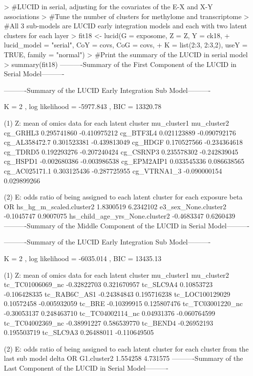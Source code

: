 \begin{example}
> #LUCID in serial, adjusting for the covariates of the E-X and X-Y associations
> #Tune the number of clusters for methylome and transcriptome
> #All 3 sub-models are LUCID early integration models and each with two latent clusters for each layer
> fit18 <- lucid(G = exposome, Z = Z, Y = ck18, 
+                lucid_model = "serial", CoY = covs, CoG = covs, 
+                K = list(2:3, 2:3,2), useY = TRUE, family = "normal")
> #Print the summary of the LUCID in serial model
> summary(fit18)
----------Summary of the First Component of the LUCID in Serial Model---------- 
 
----------Summary of the LUCID Early Integration Sub Model---------- 
 
K =  2 , log likelihood = -5977.843 , BIC =  13320.78 
 
(1) Z: mean of omics data for each latent cluster 
               mu_cluster1  mu_cluster2
cg_GRHL3       0.295741860 -0.410975212
cg_BTF3L4      0.021123889 -0.090792176
cg_AL358472.7  0.301523381 -0.439813049
cg_HDGF        0.170527566 -0.234364618
cg_TDRD5       0.192293276 -0.207240424
cg_CSRNP3      0.235578302 -0.242839045
cg_HSPD1      -0.002680386 -0.003986538
cg_EPM2AIP1    0.033545336  0.086638565
cg_AC025171.1  0.303125436 -0.287725955
cg_VTRNA1_3   -0.090000154  0.029899266

(2) E: odds ratio of being assigned to each latent cluster for each exposure 
                                     beta        OR
hs_hg_m_scaled.cluster2         1.8300519 6.2342102
e3_sex_None.cluster2           -0.1045747 0.9007075
hs_child_age_yrs_None.cluster2 -0.4683347 0.6260439
----------Summary of the Middle Component of the LUCID in Serial Model---------- 
 
----------Summary of the LUCID Early Integration Sub Model---------- 
 
K =  2 , log likelihood = -6035.014 , BIC =  13435.13 
 
(1) Z: mean of omics data for each latent cluster 
                 mu_cluster1  mu_cluster2
tc_TC01006069_nc -0.32822703  0.321670957
tc_SLC9A4         0.10853723 -0.106428335
tc_RAB6C_AS1     -0.24384843  0.195716238
tc_LOC100129029   0.10572458 -0.005932059
tc_BRE           -0.10399915  0.125807476
tc_TC03001220_nc -0.30053137  0.248463710
tc_TC04002114_nc  0.04931376 -0.060764599
tc_TC04002369_nc -0.38991227  0.586539770
tc_BEND4         -0.26952193  0.195503719
tc_SLC9A3         0.26488011 -0.110649505

(2) E: odds ratio of being assigned to each latent cluster for each cluster 
    from the last sub model 
               delta       OR
G1.cluster2 1.554258 4.731575
----------Summary of the Last Component of the LUCID in Serial Model---------- 
 

\end{example}

